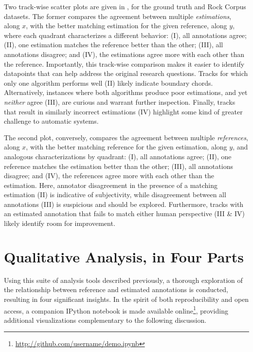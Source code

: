 \documentclass{article}
\begin{document}
Two track-wise scatter plots are given in , for the ground truth and Rock Corpus datasets.
The former compares the agreement between multiple \emph{estimations}, along $x$, with the better matching estimation for the given reference, along $y$, where each quadrant characterizes a different behavior:
(I), all annotations agree;
(II), one estimation matches the reference better than the other;
(III), all annotations disagree;
and (IV), the estimations agree more with each other than the reference.
Importantly, this track-wise comparison makes it easier to identify datapoints that can help address the original research questions.
Tracks for which only one algorithm performs well (II) likely indicate boundary chords.
Alternatively, instances where both algorithms produce poor estimations, and yet \emph{neither} agree (III), are curious and warrant further inspection.
Finally, tracks that result in similarly incorrect estimations (IV) highlight some kind of greater challenge to automatic systems.

The second plot, conversely, compares the agreement between multiple \emph{references}, along $x$, with the better matching reference for the given estimation, along $y$, and analogous characterizations by quadrant:
(I), all annotations agree;
(II), one reference matches the estimation better than the other;
(III), all annotations disagree;
and (IV), the references agree more with each other than the estimation.
Here, annotator disagreement in the presence of a matching estimation (II) is indicative of subjectivity, while disagreement between all annotations (III) is suspicious and should be explored.
Furthermore, tracks with an estimated annotation that fails to match either human perspective (III \& IV) likely identify room for improvement.


\section{Qualitative Analysis, in Four Parts}
\label{sec:analysis}

Using this suite of analysis tools described previously, a thorough exploration of the relationship between reference and estimated annotations is conducted, resulting in four significant insights.
In the spirit of both reproducibility and open access, a companion IPython notebook is made available online\footnote{\url{http://github.com/username/demo.ipynb}}, providing additional visualizations complementary to the following discussion.
\end{document}
